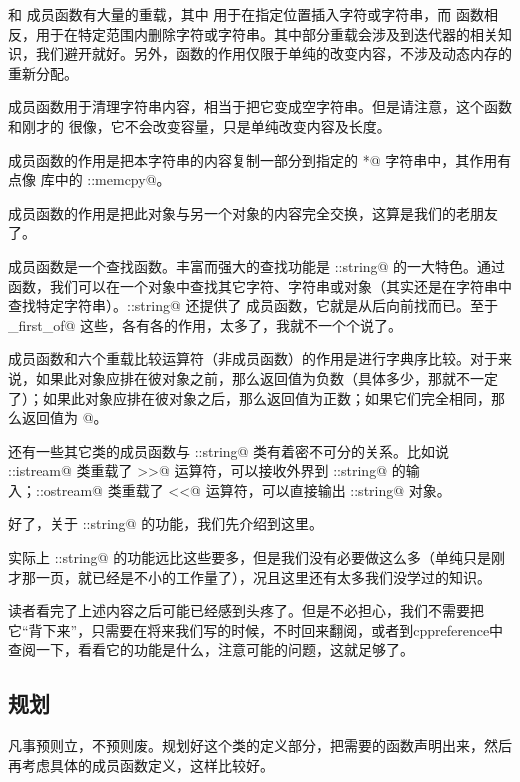 \lstinline@insert@ 和 \lstinline@erase@ 成员函数有大量的重载，其中 \lstinline@insert@ 用于在指定位置插入字符或字符串，而 \lstinline@erase@ 函数相反，用于在特定范围内删除字符或字符串。其中部分重载会涉及到迭代器的相关知识，我们避开就好。另外，\lstinline@erase@ 函数的作用仅限于单纯的改变内容，不涉及动态内存的重新分配。\par
\lstinline@clear@ 成员函数用于清理字符串内容，相当于把它变成空字符串。但是请注意，这个函数和刚才的 \lstinline@erase@ 很像，它不会改变容量，只是单纯改变内容及长度。\par
\lstinline@copy@ 成员函数的作用是把本字符串的内容复制一部分到指定的 \lstinline@char*@ 字符串中，其作用有点像 \lstinline@cstring@ 库中的 \lstinline@std::memcpy@。\par
\lstinline@swap@ 成员函数的作用是把此对象与另一个对象的内容完全交换，这算是我们的老朋友了。\par
\lstinline@find@ 成员函数是一个查找函数。丰富而强大的查找功能是 \lstinline@std::string@ 的一大特色。通过 \lstinline@find@ 函数，我们可以在一个对象中查找其它字符、字符串或对象（其实还是在字符串中查找特定字符串）。\lstinline@std::string@ 还提供了 \lstinline@rfind@ 成员函数，它就是从后向前找而已。至于 \lstinline@find_first_of@ 这些，各有各的作用，太多了，我就不一个个说了。\par
\lstinline@compare@ 成员函数和六个重载比较运算符（非成员函数）的作用是进行字典序比较。对于\newline\lstinline@compare@ 来说，如果此对象应排在彼对象之前，那么返回值为负数（具体多少，那就不一定了）；如果此对象应排在彼对象之后，那么返回值为正数；如果它们完全相同，那么返回值为 @。\par
还有一些其它类的成员函数与 \lstinline@std::string@ 类有着密不可分的关系。比如说 \lstinline@std::istream@ 类重载了 \lstinline@>>@ 运算符，可以接收外界到 \lstinline@std::string@ 的输入；\lstinline@std::ostream@ 类重载了 \lstinline@<<@ 运算符，可以直接输出 \lstinline@std::string@ 对象。\par
好了，关于 \lstinline@std::string@ 的功能，我们先介绍到这里。\par
实际上 \lstinline@std::string@ 的功能远比这些要多，但是我们没有必要做这么多（单纯只是刚才那一页，就已经是不小的工作量了），况且这里还有太多我们没学过的知识。\par
读者看完了上述内容之后可能已经感到头疼了。但是不必担心，我们不需要把它``背下来''，只需要在将来我们写的时候，不时回来翻阅，或者到cppreference中查阅一下，看看它的功能是什么，注意可能的问题，这就足够了。\par
\subsection*{规划}
凡事预则立，不预则废。规划好这个类的定义部分，把需要的函数声明出来，然后再考虑具体的成员函数定义，这样比较好。\par
